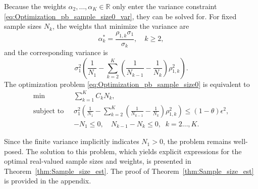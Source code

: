 Because the weights $\alpha_2,\ldots,\alpha_K\in \mathbb{R}$ only enter the variance constraint
\eqref{eq:Optimization_pb_sample_size0_var}, they can be solved for.
For fixed sample sizes $N_k$, the weights that minimize the variance are
\begin{equation}    \label{eq:MFMC_SampleSize}
      \alpha_k^*=\frac{\rho_{1,k}\sigma_1}{\sigma_k}, \quad k \ge 2,
\end{equation}
and the corresponding variance is
\[
      \sigma_1^2 \left(  \frac{1}{N_1}  -  \sum_{k=2}^K \left(\frac{1}{N_{k-1}} - \frac{1}{N_k}\right) \rho_{1,k}^2 \right).
\]
The optimization problem \eqref{eq:Optimization_pb_sample_size0} is equivalent to
\begin{subequations}\label{eq:Optimization_pb_sample_size}
    \begin{align}
    \min  \; &\sum\limits_{k=1}^K C_kN_k,\\
       \text{subject to } \; & \sigma_1^2 \left(  \frac{1}{N_1} 
                      -  \sum_{k=2}^K \left(\frac{1}{N_{k-1}} - \frac{1}{N_k}\right) \rho_{1,k}^2 \right) \le  (1-\theta)\epsilon^2,\\[2pt]
       &\displaystyle -N_1\le 0,\quad \displaystyle N_{k-1}-N_k\le 0, \;\; k=2\ldots,K.
    \end{align}
\end{subequations}



%
Since the finite variance implicitly indicates $N_1 > 0$, the problem remains well-posed. The solution to this problem, which yields explicit expressions for the optimal real-valued sample sizes and weights, is presented in Theorem~\ref{thm:Sample_size_est}. The proof of Theorem~\ref{thm:Sample_size_est} is provided in the appendix.




